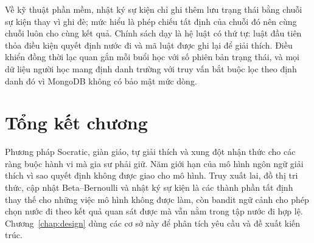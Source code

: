 Về kỹ thuật phần mềm, nhật ký sự kiện chỉ ghi thêm lưu trạng thái bằng chuỗi sự kiện thay vì ghi đè; mức hiểu là phép chiếu tất định của chuỗi đó nên cùng chuỗi luôn cho cùng kết quả. Chính sách dạy là hệ luật có thứ tự: luật đầu tiên thỏa điều kiện quyết định nước đi và mã luật được ghi lại để giải thích. Điều khiển đồng thời lạc quan gắn mỗi buổi học với số phiên bản trạng thái, và mọi dữ liệu người học mang định danh trường với truy vấn bắt buộc lọc theo định danh đó vì MongoDB không có bảo mật mức dòng.

\section{Tổng kết chương}
Phương pháp Socratic, giàn giáo, tự giải thích và xung đột nhận thức cho các ràng buộc hành vi mà gia sư phải giữ. Năm giới hạn của mô hình ngôn ngữ giải thích vì sao quyết định không được giao cho mô hình. Truy xuất lai, đồ thị tri thức, cập nhật Beta--Bernoulli và nhật ký sự kiện là các thành phần tất định thay thế cho những việc mô hình không được làm, còn bandit ngữ cảnh cho phép chọn nước đi theo kết quả quan sát được mà vẫn nằm trong tập nước đi hợp lệ. Chương~\ref{chap:design} dùng các cơ sở này để phân tích yêu cầu và đề xuất kiến trúc.
